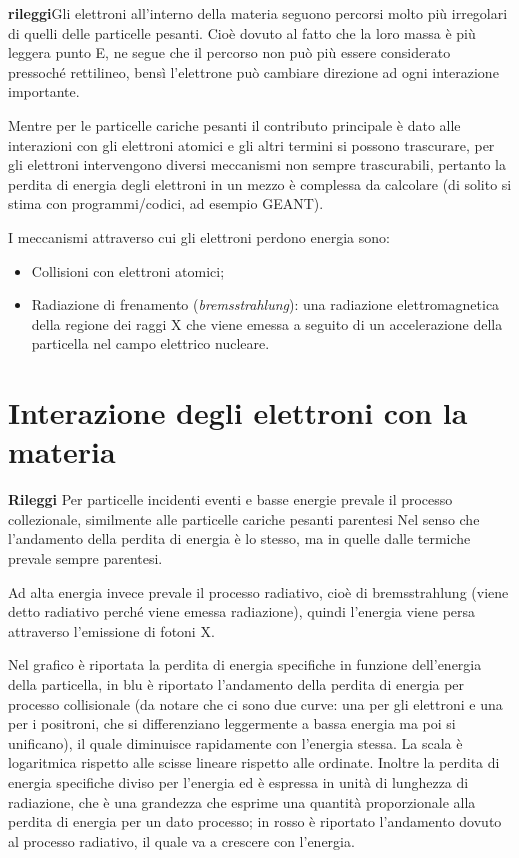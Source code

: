 \textbf{rileggi}Gli elettroni all'interno della materia seguono percorsi molto più irregolari di quelli delle particelle pesanti. Cioè dovuto al fatto che la loro massa è più leggera punto E, ne segue che il percorso non può più essere considerato pressoché rettilineo, bensì l'elettrone può cambiare direzione ad ogni interazione importante.

Mentre per le particelle cariche pesanti il contributo principale è dato alle interazioni con gli elettroni atomici e gli altri termini si possono trascurare, per gli elettroni intervengono diversi meccanismi non sempre trascurabili, pertanto la perdita di energia degli elettroni in un mezzo è complessa da calcolare (di solito si stima con programmi/codici, ad esempio GEANT).

I meccanismi attraverso cui gli elettroni perdono energia sono:

\begin{itemize}
    \item Collisioni con elettroni atomici;
    \item Radiazione di frenamento (\textit{bremsstrahlung}): una radiazione elettromagnetica della regione dei raggi X che viene emessa a seguito di un accelerazione della particella nel campo elettrico nucleare.
\end{itemize}

\section{Interazione degli elettroni con la materia}

\textbf{Rileggi}
Per particelle incidenti eventi e basse energie prevale il processo collezionale, similmente alle particelle cariche pesanti parentesi Nel senso che l'andamento della perdita di energia è lo stesso, ma in quelle dalle termiche prevale sempre parentesi.

Ad alta energia invece prevale il processo radiativo, cioè di bremsstrahlung (viene detto radiativo perché viene emessa radiazione), quindi l'energia viene persa attraverso l'emissione di fotoni X.

Nel grafico è riportata la perdita di energia specifiche in funzione dell'energia della particella, in blu è riportato l'andamento della perdita di energia per processo collisionale (da notare che ci sono due curve: una per gli elettroni e una per i positroni, che si differenziano leggermente a bassa energia ma poi si unificano), il quale diminuisce rapidamente con l'energia stessa. La scala è logaritmica rispetto alle scisse lineare rispetto alle ordinate. Inoltre la perdita di energia specifiche diviso per l'energia ed è espressa in unità di lunghezza di radiazione, che è una grandezza che esprime una quantità proporzionale alla perdita di energia per un dato processo; in rosso è riportato l'andamento dovuto al processo radiativo, il quale va a crescere con l'energia.

